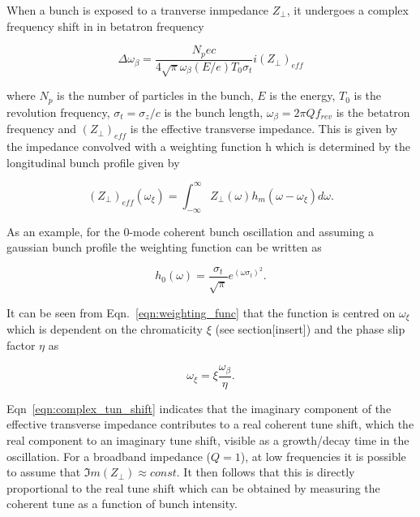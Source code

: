 When a bunch is exposed to a tranverse inmpedance $Z_{\perp}$, it undergoes a complex frequency shift in in betatron frequency


\begin{equation}
\Delta{}\omega_{\beta} = \frac{N_{p}ec}{4\sqrt{\pi}\omega_{\beta} \left( E/e \right)T_{0}\sigma_{t}} i\left( Z_{\perp} \right)_{eff}
\label{eqn:complex_tun_shift}
\end{equation}

where $N_{p}$ is the number of particles in the bunch, $E$ is the energy, $T_{0}$ is the revolution frequency, $\sigma_{t} = \sigma_{z}/c$ is the bunch length, $\omega_{\beta} = 2\pi{}Q f_{rev}$ is the betatron frequency and $\left( Z_{\perp} \right)_{eff}$ is the effective transverse impedance. This is given by the impedance convolved with a weighting function h which is determined by the longitudinal bunch profile given by

\begin{equation}
\left( Z_{\perp} \right)_{eff} \left( \omega_{\xi} \right) = \int_{-\infty}^{\infty} Z_{\perp} \left( \omega \right) h_{m} \left(  \omega - \omega_{\xi} \right) d\omega.
\end{equation}

As an example, for the 0-mode coherent bunch oscillation and assuming a gaussian bunch profile the weighting function can be written as

\begin{equation}
h_{0} \left( \omega \right) = \frac{\sigma_{t}}{\sqrt{\pi}}e^{ \left(  \omega \sigma_{t}  \right)^{2}}.
\label{eqn:weighting_func}
\end{equation}

It can be seen from Eqn.~\ref{eqn:weighting_func} that the function is centred on $\omega_{\xi}$ which is dependent on the chromaticity $\xi$ (see section[insert]) and the phase slip factor $\eta$ as

\begin{equation}
\omega_{\xi} = \xi \frac{\omega_{\beta}}{\eta}.
\end{equation}

Eqn~\ref{eqn:complex_tun_shift} indicates that the imaginary component of the effective transverse impedance contributes to a real coherent tune shift, which the real component to an imaginary tune shift, visible as a growth/decay time in the oscillation. For a broadband impedance ($Q=1$), at low frequencies it is possible to assume that $\Im{}m\left(  Z_{\perp} \right) \approx const.$ It then follows that this is directly proportional to the real tune shift which can be obtained by measuring the coherent tune as a function of bunch intensity.

